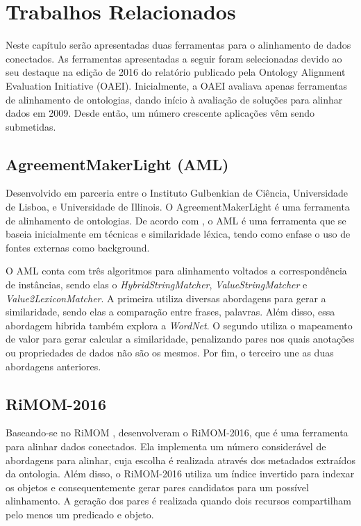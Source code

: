 \chapter{Trabalhos Relacionados}

Neste capítulo serão apresentadas duas ferramentas para o alinhamento de dados conectados. As ferramentas apresentadas a seguir foram selecionadas devido ao seu destaque na edição de 2016 do relatório publicado pela Ontology Alignment Evaluation Initiative (OAEI). Inicialmente, a OAEI avaliava apenas ferramentas de alinhamento de ontologias, dando início à avaliação de soluções para alinhar dados em 2009. Desde então, um número crescente aplicações vêm sendo submetidas.

\section{AgreementMakerLight (AML)}
Desenvolvido em parceria entre o Instituto Gulbenkian de Ciência, Universidade de Lisboa, e Universidade de Illinois. O AgreementMakerLight é uma ferramenta de alinhamento de ontologias. De acordo com \cite{fariaoaei}, o AML é uma ferramenta que se baseia inicialmente em técnicas e similaridade léxica, tendo como enfase o uso de fontes externas como background.

O AML conta com três algoritmos para alinhamento voltados a correspondência de instâncias, sendo elas o \textit{HybridStringMatcher}, \textit{ValueStringMatcher} e \textit{Value2LexiconMatcher}. A primeira utiliza diversas abordagens para gerar a similaridade, sendo elas a comparação entre frases, palavras. Além disso, essa abordagem hibrida também explora a \textit{WordNet}. O segundo utiliza o mapeamento de valor para gerar calcular a similaridade, penalizando pares nos quais anotações ou propriedades de dados não são os mesmos. Por fim, o terceiro une as duas abordagens anteriores.

\section{RiMOM-2016}
Baseando-se no RiMOM  \cite{li2009rimom}, \cite{zhang2016rimom} desenvolveram o RiMOM-2016, que é uma ferramenta para alinhar dados conectados. Ela implementa um número considerável de abordagens para alinhar, cuja escolha é realizada através dos metadados extraídos da ontologia. Além disso, o RiMOM-2016 utiliza um índice invertido para indexar os objetos e consequentemente gerar pares candidatos para um possível alinhamento. A geração dos pares é realizada quando dois recursos compartilham pelo menos um predicado e objeto.

